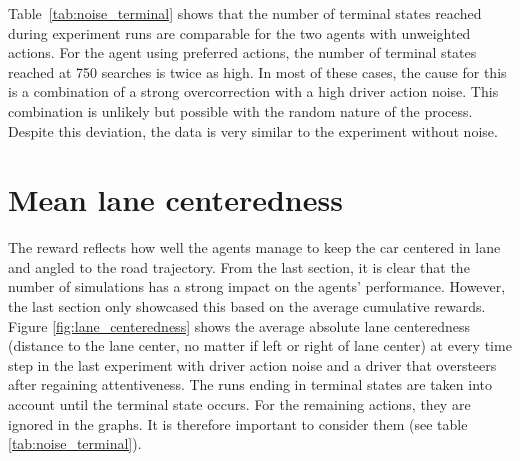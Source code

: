 Table~\ref{tab:noise_terminal} shows that the number of terminal states reached during experiment runs are comparable for the two agents with unweighted actions. For the agent using preferred actions, the number of terminal states reached at 750 searches is twice as high. In most of these cases, the cause for this is a combination of a strong overcorrection with a high driver action noise. This combination is unlikely but possible with the random nature of the process. Despite this deviation, the data is very similar to the experiment without noise.






\section{Mean lane centeredness}
\label{sec:centeredness}


The reward reflects how well the agents manage to keep the car centered in lane and angled to the road trajectory. From the last section, it is clear that the number of simulations has a strong impact on the agents' performance. However, the last section only showcased this based on the average cumulative rewards. Figure \ref{fig:lane_centeredness} shows the average absolute lane centeredness (distance to the lane center, no matter if left or right of lane center) at every time step in the last experiment with driver action noise and a driver that oversteers after regaining attentiveness. The runs ending in terminal states are taken into account until the terminal state occurs. For the remaining actions, they are ignored in the graphs. It is therefore important to consider them (see table \ref{tab:noise_terminal}). 

